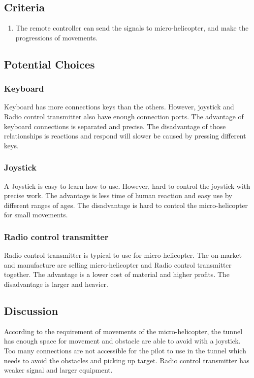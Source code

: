 \documentclass[letterpaper, 10, draftclsnofoot, onecolumn, compsoc]{IEEEtran}
\begin{document}
{\subsection{Criteria}
\begin{enumerate}
\item{The remote controller can send the signals to micro-helicopter, and make the progressions of movements.}
\end{enumerate}

\subsection{Potential Choices}

\subsubsection{Keyboard}
Keyboard has more connections keys than the others.
However, joystick and Radio control transmitter also have enough connection ports.
The advantage of keyboard connections is separated and precise.
The disadvantage of those relationships is reactions and respond will slower be caused by pressing different keys.

\subsubsection{Joystick}
A Joystick is easy to learn how to use. However, hard to control the joystick with precise work.
The advantage is less time of human reaction and easy use by different ranges of ages.
The disadvantage is hard to control the micro-helicopter for small movements.

\subsubsection{Radio control transmitter}
Radio control transmitter is typical to use for micro-helicopter.
The on-market and manufacture are selling micro-helicopter and Radio control transmitter together.
The advantage is a lower cost of material and higher profits. The disadvantage is larger and heavier.

\subsection{Discussion}
According to the requirement of movements of the micro-helicopter, the tunnel has enough space for movement and obstacle are able to avoid with a joystick.
Too many connections are not accessible for the pilot to use in the tunnel which needs to avoid the obstacles and picking up target.
Radio control transmitter has weaker signal and larger equipment.

}
\end{document}
